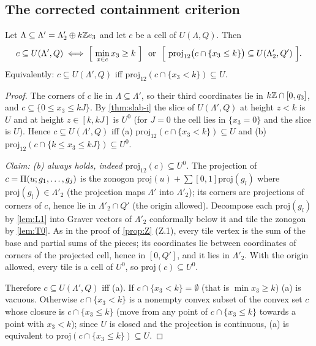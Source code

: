 \subsection{The corrected containment criterion}\label{sec:slab-ii}
\begin{theorem}\label{thm:slab-ii}
Let $\Lambda\subseteq\Lambda'=\Lambda'_2\oplus k\mathbb Z e_3$ and let $c$ be a cell of $U(\Lambda,Q)$. Then
\[
c\subseteq U(\Lambda',Q)\iff\Bigl[\ \min_{x\in c}x_3\ge k\ \Bigr]\ \text{ or }\ \Bigl[\ \mathrm{proj}_{12}\bigl(c\cap\{x_3\le k\}\bigr)\subseteq U(\Lambda'_2,Q')\ \Bigr].
\]
Equivalently: $c\subseteq U(\Lambda',Q)$ iff $\mathrm{proj}_{12}(c\cap\{x_3<k\})\subseteq U$.
\end{theorem}
\begin{proof}
The corners of $c$ lie in $\Lambda\subseteq\Lambda'$, so their third coordinates lie in $k\mathbb Z\cap[0,q_3]$, and $c\subseteq\{0\le x_3\le kJ\}$. By \cref{thm:slab-i} the slice of $U(\Lambda',Q)$ at height $z<k$ is $U$ and at height $z\in[k,kJ]$ is $U^0$ (for $J=0$ the cell lies in $\{x_3=0\}$ and the slice is $U$). Hence $c\subseteq U(\Lambda',Q)$ iff (a) $\mathrm{proj}_{12}(c\cap\{x_3<k\})\subseteq U$ and (b) $\mathrm{proj}_{12}(c\cap\{k\le x_3\le kJ\})\subseteq U^0$.

\emph{Claim: (b) always holds, indeed $\mathrm{proj}_{12}(c)\subseteq U^0$.} The projection of $c=\Pi(u;g_1,\dots,g_j)$ is the zonogon $\mathrm{proj}(u)+\sum[0,1]\mathrm{proj}(g_l)$ where $\mathrm{proj}(g_l)\in\Lambda'_2$ (the projection maps $\Lambda'$ into $\Lambda'_2$); its corners are projections of corners of $c$, hence lie in $\Lambda'_2\cap Q'$ (the origin allowed). Decompose each $\mathrm{proj}(g_l)$ by \cref{lem:L1} into Graver vectors of $\Lambda'_2$ conformally below it and tile the zonogon by \cref{lem:T0}. As in the proof of \cref{prop:Z} (Z.1), every tile vertex is the sum of the base and partial sums of the pieces; its coordinates lie between coordinates of corners of the projected cell, hence in $[0,Q']$, and it lies in $\Lambda'_2$. With the origin allowed, every tile is a cell of $U^0$, so $\mathrm{proj}(c)\subseteq U^0$.

Therefore $c\subseteq U(\Lambda',Q)$ iff (a). If $c\cap\{x_3<k\}=\emptyset$ (that is $\min x_3\ge k$) (a) is vacuous. Otherwise $c\cap\{x_3<k\}$ is a nonempty convex subset of the convex set $c$ whose closure is $c\cap\{x_3\le k\}$ (move from any point of $c\cap\{x_3\le k\}$ towards a point with $x_3<k$); since $U$ is closed and the projection is continuous, (a) is equivalent to $\mathrm{proj}(c\cap\{x_3\le k\})\subseteq U$. \qedhere
\end{proof}
